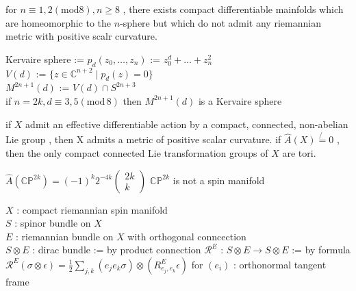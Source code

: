 \begin{Theorem}
\itemprop
  for \(n \equiv 1 , 2 (\text{mod} 8) , n \geq 8\) , there exists compact differentiable mainfolds which are homeomorphic to the \(n\)-sphere but which do not admit any riemannian metric with positive scalr curvature.
\end{Theorem}

\begin{Proof}
\itemprof
  \ADMIT
\end{Proof}

\begin{Theorem}
\itemdefi
  \Let Kervaire sphere := 
\itemdefi
  \Let \(p_d(z_0 , \ldots , z_n)\) := \(z_0^d + \ldots + z_n^2\) \\
  \Let \(V(d)\) := \(\{z \in \mathbb{C}^{n+2} \mid p_d(z) = 0\}\) \\
  \Let \(M^{2n+1}(d)\) := \(V(d) \cap S^{2n+3}\) \\
\itemprop
  if \(n = 2k , d \equiv 3,5 (\text{mod} \, 8)\) then \(M^{2n+1}(d)\) is a Kervaire sphere
\end{Theorem}

\begin{Proof}
\itemprof
  \ADMIT
\end{Proof}

\begin{Theorem}
\itemprop
  if \(X\) admit an effective differentiable action by a compact, connected, non-abelian Lie group , then X admits a metric of positive scalar curvature.
\itemprop 
  if \(\hat{A}(X) \not{=} 0\) , then the only compact connected Lie transformation groups of \(X\) are tori.
\end{Theorem}

\begin{Proof}
\itemprof
  \ADMIT
\end{Proof}

\begin{Theorem}
\itemprop
  \(\hat{A}(\mathbb{CP}^{2k}) = (-1)^k2^{-4k} \begin{pmatrix} 2k \\ k \end{pmatrix}\)
\itemprop
  \(\mathbb{CP}^{2k}\) is not a spin manifold
\end{Theorem}

\begin{Definition}
\itemwhen
  \Fix \(X\) : compact riemannian spin manifold \\
  \Fix \(S\) : spinor bundle on \(X\) \\
  \Fix \(E\) : riemannian bundle on \(X\) with orthogonal conncection \\
  \Let \(S \otimes E\) : dirac bundle := by product connection 
\itemdefi 
  \Define \(\mathcal{R}^E\) : \(S \otimes E \to S \otimes E\) := by formula \(\mathcal{R}^E(\sigma \otimes \epsilon) = \frac{1}{2}\sum_{j,k} (e_j e_k \sigma) \otimes (R_{e_j , e_k}^E \epsilon)\) for \((e_i)\) : orthonormal tangent frame
\end{Definition}

